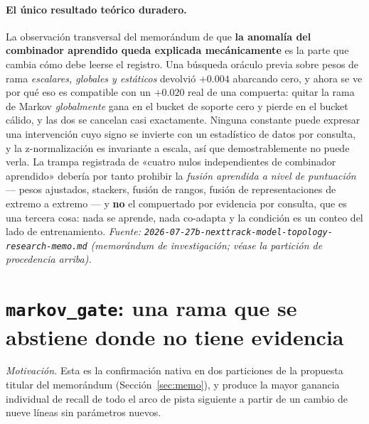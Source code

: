 \documentclass[11pt]{article}
\begin{document}
\paragraph{El único resultado teórico duradero.} La observación transversal del
memorándum de que \textbf{la anomalía del combinador aprendido queda explicada
mecánicamente} es la parte que cambia cómo debe leerse el registro. Una búsqueda
oráculo previa sobre pesos de rama \emph{escalares, globales y estáticos} devolvió
$+\num{0.004}$ abarcando cero, y ahora se ve por qué eso es compatible con un
$+\num{0.020}$ real de una compuerta: quitar la rama de Markov \emph{globalmente}
gana en el bucket de soporte cero y pierde en el bucket cálido, y las dos se
cancelan casi exactamente. Ninguna constante puede expresar una intervención cuyo
signo se invierte con un estadístico de datos por consulta, y la z-normalización es
invariante a escala, así que demostrablemente no puede verla. La trampa registrada
de «cuatro nulos independientes de combinador aprendido» debería por tanto prohibir
la \emph{fusión aprendida a nivel de puntuación} --- pesos ajustados, stackers,
fusión de rangos, fusión de representaciones de extremo a extremo --- y
\textbf{no} el compuertado por evidencia por consulta, que es una tercera cosa:
nada se aprende, nada co-adapta y la condición es un conteo del lado de
entrenamiento.
\emph{Fuente: \texttt{2026-07-27b-nexttrack-model-topology-research-memo.md}
(memorándum de investigación; véase la partición de procedencia arriba).}

\section{\texttt{markov\_gate}: una rama que se abstiene donde no tiene evidencia}
\label{sec:markovgate}
\emph{Motivación.} Esta es la confirmación nativa en dos particiones de la
propuesta titular del memorándum (Sección~\ref{sec:memo}), y produce la mayor
ganancia individual de recall de todo el arco de pista siguiente a partir de un
cambio de nueve líneas sin parámetros nuevos.
\end{document}
